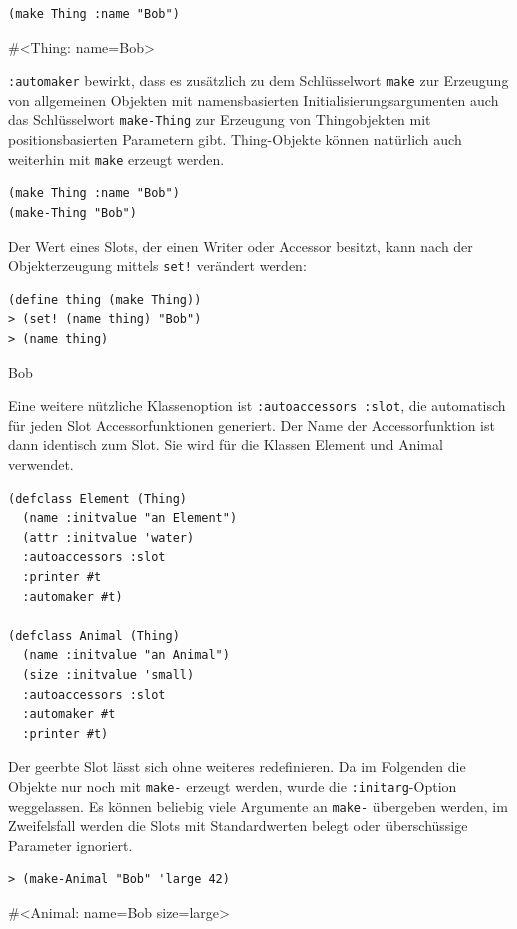 \begin{lstlisting}
(make Thing :name "Bob")
\end{lstlisting}
{\routput \#<Thing: name={\qq}Bob\qq>}

\texttt{:automaker} bewirkt, dass es zusätzlich zu dem Schlüsselwort \texttt{make} zur Erzeugung von allgemeinen Objekten mit namensbasierten Initialisierungsargumenten auch das Schlüsselwort \texttt{make-Thing} zur Erzeugung von Thingobjekten mit positionsbasierten Parametern gibt. Thing-Objekte können natürlich auch weiterhin mit \texttt{make} erzeugt werden.

\begin{lstlisting}
(make Thing :name "Bob")
(make-Thing "Bob")
\end{lstlisting}

Der Wert eines Slots, der einen Writer oder Accessor besitzt, kann nach der Objekterzeugung mittels \texttt{set!} verändert werden:

\begin{lstlisting}
(define thing (make Thing))
> (set! (name thing) "Bob")
> (name thing)
\end{lstlisting}
{\routput {\qq}Bob\qq}

Eine weitere nützliche Klassenoption ist \texttt{:autoaccessors :slot}, die automatisch für jeden Slot Accessorfunktionen generiert. Der Name der Accessorfunktion ist dann identisch zum Slot. Sie wird für die Klassen Element und Animal verwendet.

\begin{lstlisting}
(defclass Element (Thing)
  (name :initvalue "an Element") 
  (attr :initvalue 'water)
  :autoaccessors :slot 
  :printer #t          
  :automaker #t)
  
(defclass Animal (Thing)
  (name :initvalue "an Animal")      
  (size :initvalue 'small)
  :autoaccessors :slot
  :automaker #t
  :printer #t)
\end{lstlisting}

Der geerbte Slot lässt sich ohne weiteres redefinieren. Da im Folgenden die Objekte nur noch mit \texttt{make-} erzeugt werden, wurde die \texttt{:initarg}-Option weggelassen. Es können beliebig viele Argumente an \texttt{make-} übergeben werden, im Zweifelsfall werden die Slots mit Standardwerten belegt oder überschüssige Parameter ignoriert.

\begin{lstlisting}
> (make-Animal "Bob" 'large 42)
\end{lstlisting}
{\routput \#<Animal: name={\qq}Bob{\qq} size=large>}

